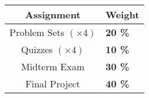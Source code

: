 \begin{table}[ht]
    \centering
    \begin{tabular}{c|l}
    \textbf{Assignment} & \textbf{Weight} \\
    \toprule
    Problem Sets $(\times 4)$  & \textbf{20 \%} \\
    Quizzes $(\times 4)$ & \textbf{10 \%} \\
    Midterm Exam  & \textbf{30 \%} \\
    Final Project  & \textbf{40 \%} \\
    \bottomrule
    \end{tabular}
    \label{Grade-Dist}
\end{table}